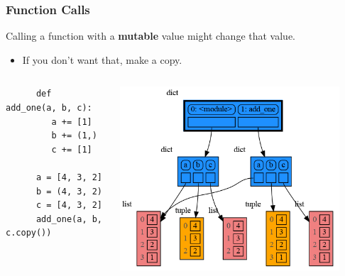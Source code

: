 \documentclass[10pt, colorlinks=true, urlcolor=blue]{beamer}
\begin{document}
\begin{frame}[fragile]
\frametitle{Function Calls}
  Calling a function with a \textbf{mutable} value might change that value.
  \begin{itemize}
  \item If you don't want that, make a copy.
  \end{itemize}

  \begin{columns}
    \begin{verbatim}
      def add_one(a, b, c):
         a += [1]
         b += (1,)
         c += [1]
         
      a = [4, 3, 2]
      b = (4, 3, 2)
      c = [4, 3, 2]
      add_one(a, b, c.copy())
    \end{verbatim}
    \begin{center}\includegraphics[width=0.9\textwidth]{figures/function_call.png}\end{center}
  \end{columns}
\end{frame}
\end{document}
